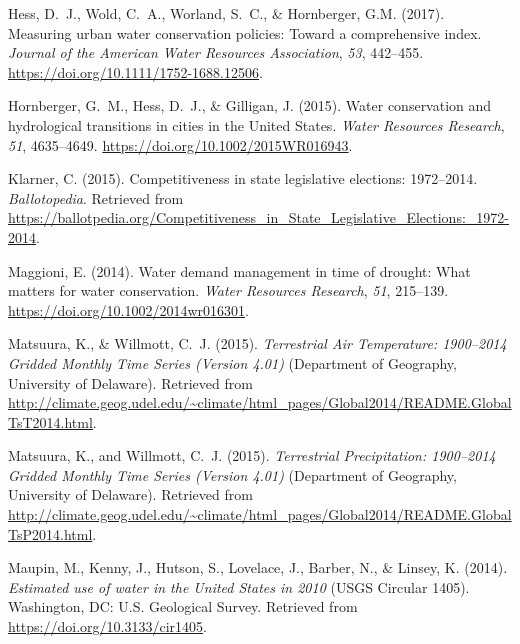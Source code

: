 \documentclass[draft]{agujournal}\usepackage{knitr}
\begin{document}
\begin{thebibliography}{33}
  Hess, D.~J., Wold, C.~A., Worland, S.~C., \& Hornberger, G.M. (2017).
  Measuring urban water conservation policies: Toward a comprehensive index.
  \textit{Journal of the American Water Resources Association},
  \textit{53}, 442--455.
  \url{https://doi.org/10.1111/1752-1688.12506}.

  Hornberger, G.~M., Hess, D.~J., \& Gilligan, J. (2015).
  Water conservation and hydrological transitions in cities in the {U}nited {S}tates.
  \textit{Water Resources Research}, \textit{51}, 4635--4649.
  \url{https://doi.org/10.1002/2015WR016943}.

  Klarner, C. (2015).
  Competitiveness in state legislative elections: 1972--2014.
  \textit{Ballotopedia}.
  Retrieved from
  \url{https://ballotpedia.org/Competitiveness_in_State_Legislative_Elections:_1972-2014}.

  Maggioni, E. (2014).
  Water demand management in time of drought: {W}hat matters for water conservation.
  \textit{Water Resources Research}, \textit{51}, 215--139.
  \url{https://doi.org/10.1002/2014wr016301}.

  Matsuura, K., \& Willmott, C.~J. (2015{}).
  \textit{Terrestrial Air Temperature: 1900--2014 Gridded Monthly Time Series (Version 4.01)\/}
  (Department of  Geography, University of Delaware).
  Retrieved from
  \url{http://climate.geog.udel.edu/~climate/html_pages/Global2014/README.GlobalTsT2014.html}.

  Matsuura, K., and Willmott, C.~J. (2015{}).
  \textit{Terrestrial Precipitation: 1900--2014 Gridded Monthly Time Series (Version 4.01)\/}
  (Department of  Geography, University of Delaware).
  Retrieved from
  \url{http://climate.geog.udel.edu/~climate/html_pages/Global2014/README.GlobalTsP2014.html}.

  Maupin, M., Kenny, J., Hutson, S., Lovelace, J., Barber, N., \& Linsey, K. (2014).
  \textit{Estimated use of water in the {U}nited {S}tates in 2010\/}
  (USGS Circular 1405).
  Washington, DC: U.S. Geological Survey.
  Retrieved from
  \url{https://doi.org/10.3133/cir1405}.


\end{thebibliography}
\end{document}
